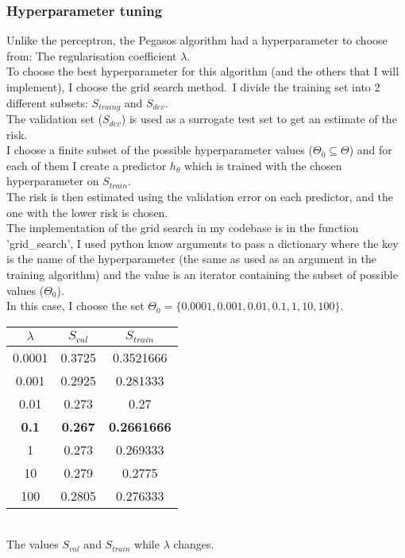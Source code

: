 \subsubsection{Hyperparameter tuning}
Unlike the perceptron, the Pegasos algorithm had a hyperparameter to choose from: The regularisation coefficient $\lambda$.\\
To choose the best hyperparameter for this algorithm (and the others that I will implement), I choose the grid search method.\
I divide the training set into 2 different subsets: $S_{traing}$ and $S_{dev}$.\\
The validation set ($S_{dev}$) is used as a surrogate test set to get an estimate of the risk.\\
I choose a finite subset of the possible hyperparameter values ($\Theta_0 \subseteq \Theta$) and for each of them I create a predictor $h_\theta$ which is trained with the chosen hyperparameter on $S_{train}$.\\
The risk is then estimated using the validation error on each predictor, and the one with the lower risk is chosen.\\
The implementation of the grid search in my codebase is in the function 'grid\_search', I used python know arguments to pass a dictionary where the key is the name of the hyperparameter (the same as used as an argument in the training algorithm) and the value is an iterator containing the subset of possible values ($\Theta_0$).\\ 
In this case, I choose the set $\Theta_0 = \{ 0.0001, 0.001, 0.01, 0.1, 1, 10, 100 \}$.\\

\begin{center}
    \begin{tabular}{| c | c | c |}
        \hline
        $\lambda$ & $S_{val}$ & $S_{train}$ \\
        \hline
        0.0001 & 0.3725 & 0.3521666 \\
        \hline
        0.001 & 0.2925 & 0.281333 \\
        \hline
        0.01 & 0.273 & 0.27 \\
        \hline
        \textbf{0.1} & \textbf{0.267} & \textbf{0.2661666} \\
        \hline
        1 & 0.273 & 0.269333 \\
        \hline
        10 & 0.279 & 0.2775 \\
        \hline
        100 & 0.2805 & 0.276333 \\
        \hline
    \end{tabular}
    \\
    The values $S_{val}$ and $S_{train}$ while $\lambda$ changes.\\
\end{center}

